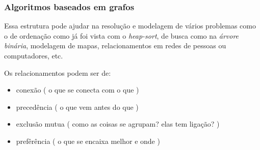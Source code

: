 \begin{frame}
	\frametitle{Algoritmos baseados em grafos}
	\par Essa estrutura pode ajudar na resolução e modelagem de vários problemas como o de ordenação como já foi vista com o \textit{heap-sort}, de busca como na \textit{árvore binária}, modelagem de mapas, relacionamentos em redes de pessoas ou computadores, etc.
	\par Os relacionamentos podem ser de:
	\begin{itemize}
		\item conexão ( o que se conecta com o que )
		\item precedência ( o que vem antes do que )
		\item exclusão mutua ( como as coisas se agrupam? elas tem ligação? )
		\item prefêrência ( o que se encaixa melhor e onde )
	\end{itemize}
\end{frame}

